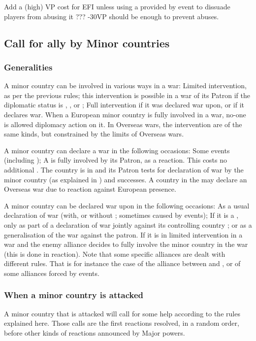 \begin{todo}
  Add a (high) VP cost for EFI unless using a \CB provided by event to
  dissuade players from abusing it ??? -30VP should be enough to prevent
  abuses.
\end{todo}



\subsection{Call for ally by Minor countries}


\subsubsection{Generalities}
\aparag A minor country can be involved in various ways in a war:
\bparag Limited intervention, as per the previous rules; this intervention is
possible in a war of its Patron if the diplomatic status is \AM, \CE, \EG or
\VASSAL;
\bparag Full intervention if it was declared war upon, or if it declares
war. When a European minor country is fully involved in a war, no-one is
allowed diplomacy action on it.
\bparag In Overseas wars, the intervention are of the same kinds, but
constrained by the limits of Overseas wars.

\aparag A minor country can declare a war in the following occasions:
\bparag Some events (including \RD);
\bparag A \VASSAL is fully involved by its Patron, as a reaction. This costs
no additional \STAB.
\bparag The country is in \EG and its Patron tests for declaration of war by
the minor country (as explained in ) and
successes.
\bparag A country in the \ROTW may declare an Overseas war due to reaction
against European presence.

\aparag A minor country can be declared war upon in the following occasions:
\bparag As a usual declaration of war (with, or without \CB; sometimes caused
by events);
\bparag If it is a \VASSAL, only as part of a declaration of war jointly
against its controlling country ; or as a generalisation of the war against
the patron.
\bparag If it is in limited intervention in a war and the enemy alliance
decides to fully involve the minor country in the war (this is done in
reaction).
\aparag Note that some specific alliances are dealt with different rules. That
is for instance the case of the alliance between \SPA and \hab, or of some
alliances forced by events.


\subsubsection{When a minor country is attacked}
\aparag A minor country that is attacked will call for some help according to
the rules explained here. Those calls are the first reactions resolved, in a
random order, before other kinds of reactions announced by Major powers.

